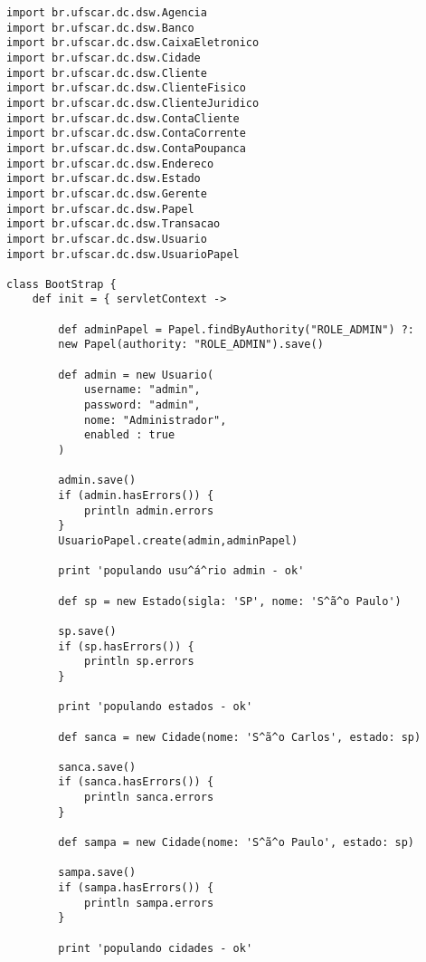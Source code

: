 \begin{lstlisting}[caption={\bf BootStrap.groovy (1)}, frame = trBL, float=htbp,
    label=codBootStrap21] 
import br.ufscar.dc.dsw.Agencia
import br.ufscar.dc.dsw.Banco
import br.ufscar.dc.dsw.CaixaEletronico
import br.ufscar.dc.dsw.Cidade
import br.ufscar.dc.dsw.Cliente
import br.ufscar.dc.dsw.ClienteFisico
import br.ufscar.dc.dsw.ClienteJuridico
import br.ufscar.dc.dsw.ContaCliente
import br.ufscar.dc.dsw.ContaCorrente
import br.ufscar.dc.dsw.ContaPoupanca
import br.ufscar.dc.dsw.Endereco
import br.ufscar.dc.dsw.Estado
import br.ufscar.dc.dsw.Gerente
import br.ufscar.dc.dsw.Papel
import br.ufscar.dc.dsw.Transacao
import br.ufscar.dc.dsw.Usuario
import br.ufscar.dc.dsw.UsuarioPapel

class BootStrap {
    def init = { servletContext ->
       
        def adminPapel = Papel.findByAuthority("ROLE_ADMIN") ?:
        new Papel(authority: "ROLE_ADMIN").save()
                
        def admin = new Usuario(
            username: "admin",
            password: "admin",
            nome: "Administrador",
            enabled : true
        )
        
        admin.save()
        if (admin.hasErrors()) {
            println admin.errors
        }
        UsuarioPapel.create(admin,adminPapel)
       
        print 'populando usu^á^rio admin - ok'
        
        def sp = new Estado(sigla: 'SP', nome: 'S^ã^o Paulo')
        
        sp.save()
        if (sp.hasErrors()) {
            println sp.errors
        }
        
        print 'populando estados - ok'
        
        def sanca = new Cidade(nome: 'S^ã^o Carlos', estado: sp)
        
        sanca.save()
        if (sanca.hasErrors()) {
            println sanca.errors
        }
        
        def sampa = new Cidade(nome: 'S^ã^o Paulo', estado: sp)
        
        sampa.save()
        if (sampa.hasErrors()) {
            println sampa.errors
        }
        
        print 'populando cidades - ok'
                        

\end{lstlisting}

